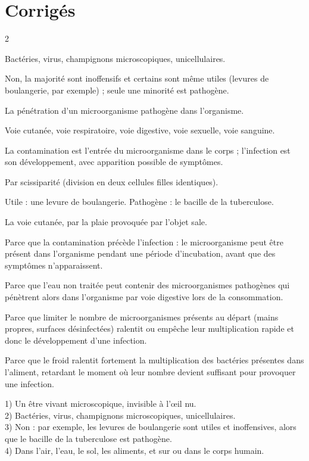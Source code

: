 \section{Corrigés}
\begin{multicols}{2}

Bactéries, virus, champignons microscopiques, unicellulaires.

Non, la majorité sont inoffensifs et certains sont même utiles (levures de
boulangerie, par exemple) ; seule une minorité est pathogène.

La pénétration d'un microorganisme pathogène dans l'organisme.

Voie cutanée, voie respiratoire, voie digestive, voie sexuelle, voie sanguine.

La contamination est l'entrée du microorganisme dans le corps ; l'infection est son
développement, avec apparition possible de symptômes.

Par scissiparité (division en deux cellules filles identiques).

Utile : une levure de boulangerie. Pathogène : le bacille de la tuberculose.

La voie cutanée, par la plaie provoquée par l'objet sale.

Parce que la contamination précède l'infection : le microorganisme peut être présent
dans l'organisme pendant une période d'incubation, avant que des symptômes
n'apparaissent.

Parce que l'eau non traitée peut contenir des microorganismes pathogènes qui pénètrent
alors dans l'organisme par voie digestive lors de la consommation.

Parce que limiter le nombre de microorganismes présents au départ (mains propres,
surfaces désinfectées) ralentit ou empêche leur multiplication rapide et donc le
développement d'une infection.

Parce que le froid ralentit fortement la multiplication des bactéries présentes dans
l'aliment, retardant le moment où leur nombre devient suffisant pour provoquer une
infection.

1) Un être vivant microscopique, invisible à l'œil nu.\\
2) Bactéries, virus, champignons microscopiques, unicellulaires.\\
3) Non : par exemple, les levures de boulangerie sont utiles et inoffensives, alors
que le bacille de la tuberculose est pathogène.\\
4) Dans l'air, l'eau, le sol, les aliments, et sur ou dans le corps humain.


\end{multicols}
